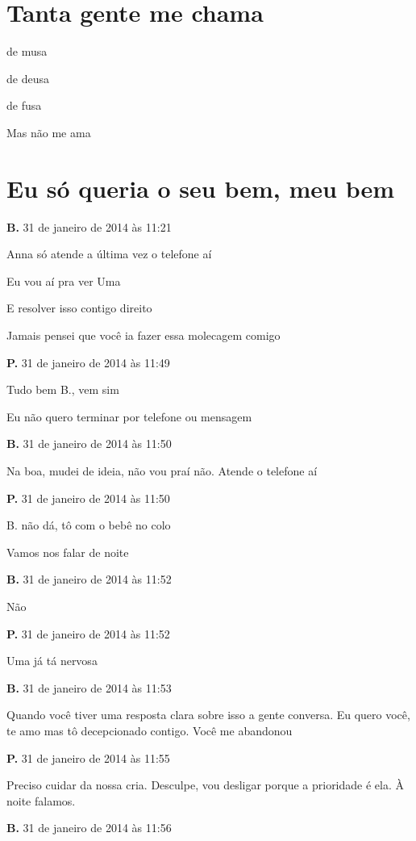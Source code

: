 \chapter{Tanta gente me chama}

{\parindent0pt
de musa

de deusa

de fusa

Mas não me ama
}


\chapter{Eu só queria o seu bem, meu bem}

{\parindent0pt\parskip1pt\raggedright
\textbf{B.} 31 de janeiro de 2014 às 11:21

Anna só atende a última vez o telefone aí

Eu vou aí pra ver Uma

E resolver isso contigo direito

Jamais pensei que você ia fazer essa molecagem comigo

\textbf{P.} 31 de janeiro de 2014 às 11:49

Tudo bem B., vem sim

Eu não quero terminar por telefone ou mensagem

\textbf{B.} 31 de janeiro de 2014 às 11:50

Na boa, mudei de ideia, não vou praí não. Atende o telefone aí

\textbf{P.} 31 de janeiro de 2014 às 11:50

B. não dá, tô com o bebê no colo

Vamos nos falar de noite

\textbf{B.} 31 de janeiro de 2014 às 11:52

Não

\textbf{P.} 31 de janeiro de 2014 às 11:52

Uma já tá nervosa

\textbf{B.} 31 de janeiro de 2014 às 11:53

Quando você tiver uma resposta clara sobre isso a gente conversa. Eu
quero você, te amo mas tô decepcionado contigo. Você me abandonou

\textbf{P.} 31 de janeiro de 2014 às 11:55

Preciso cuidar da nossa cria. Desculpe, vou desligar porque a prioridade
é ela. À noite falamos.

\textbf{B.} 31 de janeiro de 2014 às 11:56
}
